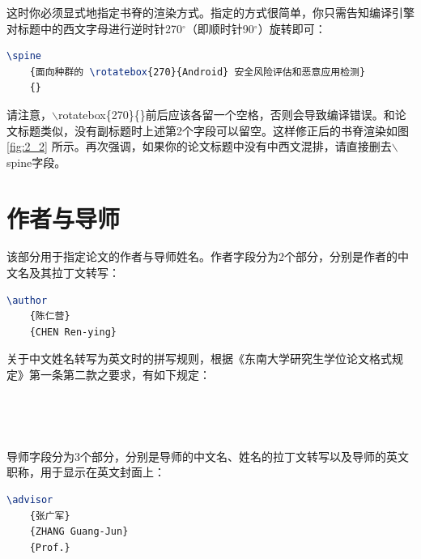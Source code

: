 \noindent 这时你必须显式地指定书脊的渲染方式。指定的方式很简单，你只需告知编译引擎对标题中的西文字母进行逆时针270$^{\circ}$（即顺时针90$^{\circ}$）旋转即可：

\begin{tcolorbox}
\begin{lstlisting}[language=TeX]
\spine
    {面向种群的 \rotatebox{270}{Android} 安全风险评估和恶意应用检测}
    {}
\end{lstlisting}
\end{tcolorbox}

\noindent 请注意，{\codefont $\backslash$rotatebox\{270\}\{\}}前后应该各留一个空格，否则会导致编译错误。和论文标题类似，没有副标题时上述第2个字段可以留空。这样修正后的书脊渲染如图 \ref{fig:2_2} 所示。再次强调，如果你的论文标题中没有中西文混排，请直接删去{\codefont $\backslash$spine}字段。

\section{作者与导师}

该部分用于指定论文的作者与导师姓名。作者字段分为2个部分，分别是作者的中文名及其拉丁文转写：

\begin{tcolorbox}
\begin{lstlisting}[language=TeX]
\author
    {陈仁营}
    {CHEN Ren-ying}
\end{lstlisting}
\end{tcolorbox}

\noindent 关于中文姓名转写为英文时的拼写规则，根据《东南大学研究生学位论文格式规定》\cite{seugs2015rule}第一条第二款之要求，有如下规定：

~


~

导师字段分为3个部分，分别是导师的中文名、姓名的拉丁文转写以及导师的英文职称，用于显示在英文封面上：

\begin{tcolorbox}
\begin{lstlisting}[language=TeX]
\advisor
    {张广军}
    {ZHANG Guang-Jun}
    {Prof.}
\end{lstlisting}
\end{tcolorbox}

